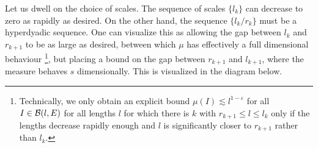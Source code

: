 \begin{remark}
	Let us dwell on the choice of scales. The sequence of scales $\{ l_k \}$ can decrease to zero as rapidly as desired. On the other hand, the sequence $\{ l_k/r_k \}$ must be a hyperdyadic sequence. One can visualize this as allowing the gap between $l_k$ and $r_{k+1}$ to be as large as desired, between which $\mu$ has effectively a full dimensional behaviour \footnote{Technically, we only obtain an explicit bound $\mu(I) \lesssim l^{1 - \varepsilon}$ for all $I \in \operatorname{\mathcal{B}}(l,E)$ for all lengths $l$ for which there is $k$ with $r_{k+1} \leq l \leq l_k$ only if the lengths decrease rapidly enough and $l$ is significantly closer to $r_{k+1}$ rather than $l_k$.}, but placing a bound on the gap between $r_{k+1}$ and $l_{k+1}$, where the measure behaves $s$ dimensionally. This is visualized in the diagram below.
\end{remark}



